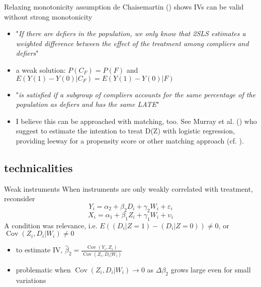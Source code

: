 \documentclass[aspectratio=169]{beamer}
\newcommand{\Cov}{\operatorname{Cov}}
\begin{document}
		\begin{frame}{Relaxing monotonicity assumption}
			de Chaisemartin (\citeyear{DeChaisemartin2017}) shows IVs can be valid without strong monotonicity \\ \vspace*{.15cm}
			\begin{itemize}
				\item "\textit{If there are defiers in the population, we only know that 2SLS estimates a weighted difference between the effect of the treatment among compliers and defiers}"
				\item<2->  a weak solution: $P(C_F)=P(F)$ and $E(Y(1) - Y(0) |  C_F) = E(Y(1) - Y(0) |  F) $
				\item<3-> "\textit{is satisfied if a subgroup of compliers accounts for the same percentage of the population as defiers and has the same LATE}"
				\item<4-> I believe this can be approached with matching, too. See Murray et al. (\citeyear{Murray2021}) who suggest to estimate the intention to treat D(Z) with logistic regression, providing leeway for a propensity score or other matching approach (cf. \cite{Hirano2003, Rosenbaum1984}).
			\end{itemize}
		\end{frame}

	\subsection{technicalities}
		\begin{frame}{Weak instruments}
			When instruments are only weakly correlated with treatment, reconsider
			\begin{equation}
				Y_{i} = \alpha_2 + \beta_2 {D}_{i} + \gamma_2 W_{i} + \varepsilon_{i}
			\end{equation}
			\begin{equation}
				X_{i} = \alpha_1 + \beta_1 Z_{i} + \gamma_1 W_{i} + \upsilon_{i}
			\end{equation}
			\vspace*{.15cm}
			A condition was relevance, i.e. $E((D_i|Z=1)-(D_i|Z=0)) \neq 0$, or $\Cov(Z_i,D_i|W_i) \neq 0$
			\begin{itemize}
			 \item to estimate IV, $\widehat{\beta}_2=\frac{\Cov(Y_i,Z_i)}{\Cov(Z_i,D_i|W_i)}$
			 \item problematic when $\Cov(Z_i,D_i|W_i) \to 0$ as $\Delta \beta_2$ grows large even for small variations
			\end{itemize}
		\end{frame}
\end{document}

